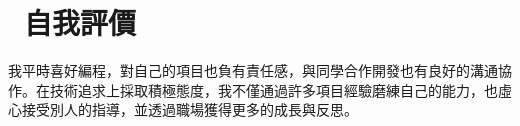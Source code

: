 \documentclass[10pt, a4paper]{article}
\begin{document}
\section{\color{CVBlue}\faChalkboard\ 自我評價}

\quad\quad 我平時喜好編程，對自己的項目也負有責任感，與同學合作開發也有良好的溝通協作。在技術追求上採取積極態度，我不僅通過許多項目經驗磨練自己的能力，也虛心接受別人的指導，並透過職場獲得更多的成長與反思。
\end{document}
